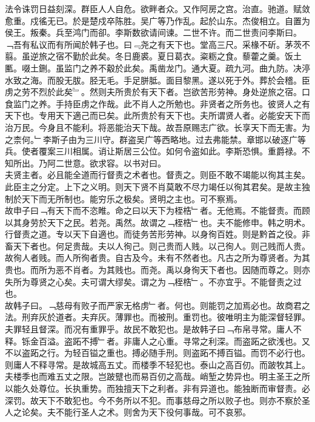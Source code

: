 \documentclass{zhvt-classic}
\begin{document}
\hspace*{2em}法令诛罚日益刻深。群臣人人自危。欲畔者众。又作阿房之宫。治直。驰道。赋敛愈重。戍徭无已。於是楚戍卒陈胜。吴广等乃作乱。起於山东。杰俊相立。自置为侯王。叛秦。兵至鸿门而卻。李斯数欲请间谏。二世不许。而二世责问李斯曰。﹁吾有私议而有所闻於韩子也。曰﹃尧之有天下也。堂高三尺。采椽不斫。茅茨不翦。虽逆旅之宿不勤於此矣。冬日鹿裘。夏日葛衣。粢粝之食。藜藿之羹。饭土匭。啜土鉶。虽监门之养不觳於此矣。禹凿龙门。通大夏。疏九河。曲九防。决渟水致之海。而股无胈。胫无毛。手足胼胝。面目黎黑。遂以死于外。葬於会稽。臣虏之劳不烈於此矣﹄。然则夫所贵於有天下者。岂欲苦形劳神。身处逆旅之宿。口食监门之养。手持臣虏之作哉。此不肖人之所勉也。非贤者之所务也。彼贤人之有天下也。专用天下適己而已矣。此所贵於有天下也。夫所谓贤人者。必能安天下而治万民。今身且不能利。将恶能治天下哉。故吾原赐志广欲。长享天下而无害。为之柰何。﹂李斯子由为三川守。群盗吴广等西略地。过去弗能禁。章邯以破逐广等兵。使者覆案三川相属。诮让斯居三公位。如何令盗如此。李斯恐惧。重爵禄。不知所出。乃阿二世意。欲求容。以书对曰。\\
\hspace*{2em}夫贤主者。必且能全道而行督责之术者也。督责之。则臣不敢不竭能以徇其主矣。此臣主之分定。上下之义明。则天下贤不肖莫敢不尽力竭任以徇其君矣。是故主独制於天下而无所制也。能穷乐之极矣。贤明之主也。可不察焉。\\
\hspace*{2em}故申子曰﹁有天下而不恣睢。命之曰以天下为桎梏﹂者。无他焉。不能督责。而顾以其身劳於天下之民。若尧。禹然。故谓之﹁桎梏﹂也。夫不能修申。韩之明术。行督责之道。专以天下自適也。而徒务苦形劳神。以身徇百姓。则是黔首之役。非畜天下者也。何足贵哉。夫以人徇己。则己贵而人贱。以己徇人。则己贱而人贵。故徇人者贱。而人所徇者贵。自古及今。未有不然者也。凡古之所为尊贤者。为其贵也。而所为恶不肖者。为其贱也。而尧。禹以身徇天下者也。因随而尊之。则亦失所为尊贤之心矣。夫可谓大缪矣。谓之为﹁桎梏﹂。不亦宜乎。不能督责之过也。\\
\hspace*{2em}故韩子曰。﹁慈母有败子而严家无格虏﹂者。何也。则能罚之加焉必也。故商君之法。刑弃灰於道者。夫弃灰。薄罪也。而被刑。重罚也。彼唯明主为能深督轻罪。夫罪轻且督深。而况有重罪乎。故民不敢犯也。是故韩子曰﹁布帛寻常。庸人不释。铄金百溢。盗跖不搏﹂者。非庸人之心重。寻常之利深。而盗跖之欲浅也。又不以盗跖之行。为轻百镒之重也。搏必随手刑。则盗跖不搏百镒。而罚不必行也。则庸人不释寻常。是故城高五丈。而楼季不轻犯也。泰山之高百仞。而跛牧其上。夫楼季也而难五丈之限。岂跛躄也而易百仞之高哉。峭堑之势异也。明主圣王之所以能久处尊位。长执重势。而独擅天下之利者。非有异道也。能独断而审督责。必深罚。故天下不敢犯也。今不务所以不犯。而事慈母之所以败子也。则亦不察於圣人之论矣。夫不能行圣人之术。则舍为天下役何事哉。可不哀邪。\\
\end{document}
